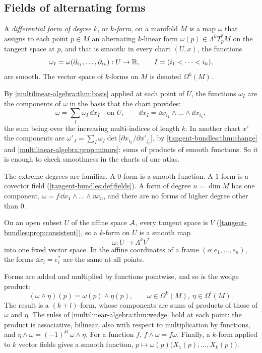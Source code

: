 \begin{notechapter}
\section{Fields of alternating forms}\label{differential-forms:sec:forms}

\begin{definition}\label{differential-forms:def:form}
A \emph{differential form of degree $k$}, or \emph{$k$-form}, on a
manifold $M$ is a map $\omega$ that assigns to each point $p\in M$ an
alternating $k$-linear form $\omega(p)\in\Lambda^kT_p^*M$ on the tangent
space at $p$, and that is smooth: in every chart $(U, x)$, the functions
\[
  \omega_I = \omega(\partial_{i_1},\dots,\partial_{i_k}):U\to\mathbb{R} ,
  \qquad I = (i_1 < \dots < i_k) ,
\]
are smooth. The vector space of $k$-forms on $M$ is denoted
$\Omega^k(M)$.
\end{definition}

By \cref{multilinear-algebra:thm:basis} applied at each point of $U$,
the functions $\omega_I$ are the components of $\omega$ in the basis
that the chart provides:
\begin{equation}\label{differential-forms:eq:components}
  \omega = \sum_I\omega_I\,\dd x_I \quad\text{on }U ,
  \qquad
  \dd x_I = \dd x_{i_1}\wedge\dots\wedge\dd x_{i_k} ,
\end{equation}
the sum being over the increasing multi-indices of length $k$. In another
chart $x'$ the components are
$\omega'_J = \sum_I\omega_I\det\bigl[\partial x_{i_a}/\partial
x'_{j_b}\bigr]$, by \cref{tangent-bundles:thm:change} and
\cref{multilinear-algebra:prop:minors}: sums of products of smooth
functions. So it is enough to check smoothness in the charts of one
atlas.

The extreme degrees are familiar. A $0$-form is a smooth function. A
$1$-form is a covector field (\cref{tangent-bundles:def:fields}). A form
of degree $n = \dim M$ has one component,
$\omega = f\,\dd x_1\wedge\dots\wedge\dd x_n$, and there are no forms of
higher degree other than $0$.

On an open subset $U$ of the affine space $\mathcal{A}$, every tangent space is
$V$ (\cref{tangent-bundles:prop:consistent}), so a $k$-form on $U$ is a
smooth map
\[
  \omega:U\to\Lambda^kV^*
\]
into one fixed vector space. In the affine coordinates of a frame
$(o; e_1,\dots,e_n)$, the forms $\dd x_i = e_i^*$ are the same at all
points.

Forms are added and multiplied by functions pointwise, and so is the
wedge product:
\[
  (\omega\wedge\eta)(p) = \omega(p)\wedge\eta(p) ,
  \qquad \omega\in\Omega^k(M),\ \eta\in\Omega^l(M) .
\]
The result is a $(k + l)$-form, whose components are sums of products of
those of $\omega$ and $\eta$. The rules of
\cref{multilinear-algebra:thm:wedge} hold at each point: the product is
associative, bilinear, also with respect to multiplication by functions,
and $\eta\wedge\omega = (-1)^{kl}\,\omega\wedge\eta$. For a function $f$,
$f\wedge\omega = f\omega$. Finally, a $k$-form applied to $k$ vector
fields gives a smooth function,
$p\mapsto\omega(p)\bigl(X_1(p),\dots,X_k(p)\bigr)$.


\end{notechapter}
